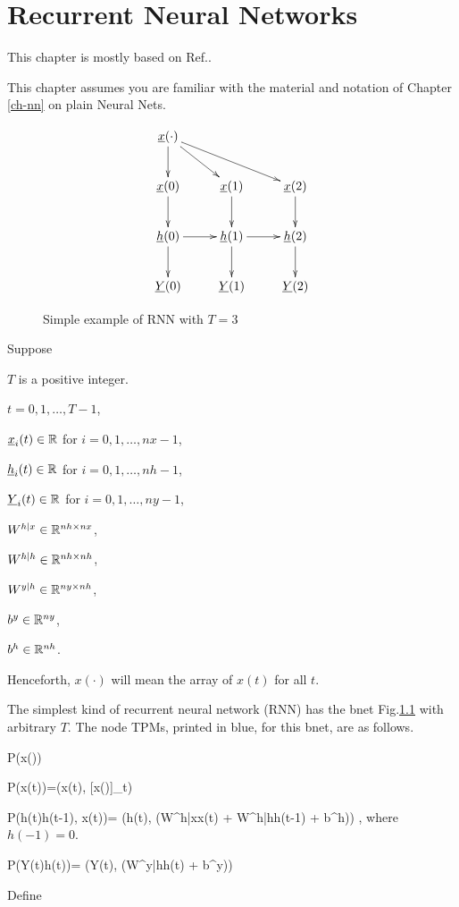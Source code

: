 \chapter{Recurrent Neural
 Networks}\label{ch-rnn}

This chapter is mostly
based on Ref.\cite{ng-rnn}.

This chapter
assumes you are
familiar 
with the material
and notation of Chapter \ref{ch-nn}
on plain Neural Nets.


\begin{figure}[h!]
\centering
$$\xymatrix{
\rvx(\cdot)\ar[d]\ar[dr]\ar[drr]\\
\rvx(0)\ar[d]&
\rvx(1)\ar[d]&
\rvx(2)\ar[d]\\
\rvh(0)\ar[d]\ar[r]&
\rvh(1)\ar[d]\ar[r]&
\rvh(2)\ar[d]\\
\rvY(0)&
\rvY(1)&
\rvY(2)
}$$
\caption{Simple example of 
RNN with $T=3$}
\label{fig-rnn}
\end{figure}

Suppose

$T$ is a positive integer.

$t=0, 1, \ldots, T-1$,

${\underline{x}}_i(t)\in { \mathbb{R}}$ for
 $i=0,1, \ldots,nx-1$,

${\underline{h}}_i(t)\in { \mathbb{R}}$ for
 $i=0,1, \ldots,nh-1$,

${\underline{Y}}_i(t)\in { \mathbb{R}}$ for
 $i=0,1, \ldots,ny-1$,

$W^{h|x}\in{ \mathbb{R}}^{nh\times nx}$,

$W^{h|h}\in{ \mathbb{R}}^{nh\times nh}$,

$W^{y|h}\in{ \mathbb{R}}^{ny\times nh}$,

$b^y\in { \mathbb{R}}^{ny}$,

$b^h\in { \mathbb{R}}^{nh}$.

Henceforth, $x(\cdot)$ will
mean the array of $x(t)$ for all $t$.

The simplest kind of
recurrent neural network (RNN)
has
the bnet Fig.\ref{fig-rnn}
with arbitrary $T$.
The node
TPMs, printed in
blue, for this bnet, are as follows.

\beq\color{blue}
P(x(\cdot))
\eeq

\beq\color{blue}
P(x(t))=\delta(x(t), [x(\cdot)]_t)
\eeq

\beq\color{blue}
P(h(t)\cond h(t-1), x(t))=
\delta(h(t),
\cala(W^{h|x}x(t) +
 W^{h|h}h(t-1) + b^h))
\;,
\eeq
where
$h(-1)=0$.

\beq\color{blue}
P(Y(t)\cond h(t))=
\delta(Y(t),
\cala(W^{y|h}h(t) + b^y))
\eeq

Define

